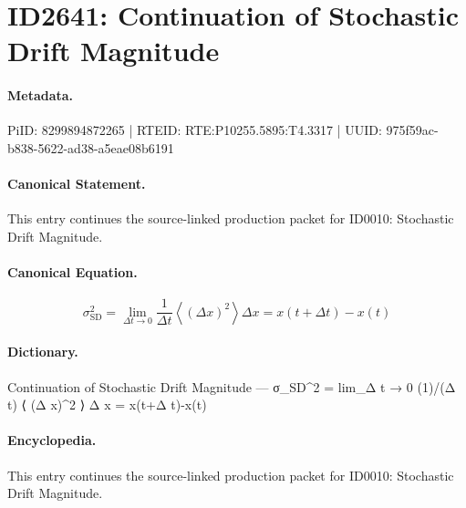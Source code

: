 \section*{ID2641: Continuation of Stochastic Drift Magnitude}
\paragraph{Metadata.}
PiID: 8299894872265 | RTEID: RTE:P10255.5895:T4.3317 | UUID: 975f59ac-b838-5622-ad38-a5eae08b6191

\paragraph{Canonical Statement.}
This entry continues the source-linked production packet for ID0010: Stochastic Drift Magnitude.

\paragraph{Canonical Equation.}
\[
\sigma_{\mathrm{SD}}^{2} = \lim_{\Delta t \to 0} \frac{1}{\Delta t} \left\langle (\Delta x)^{2} \right\rangle \Delta x = x(t+\Delta t)-x(t)
\]

\paragraph{Dictionary.}
Continuation of Stochastic Drift Magnitude — σ\_SD\textasciicircum{}2 = lim\_Δ t → 0 (1)/(Δ t) ⟨ (Δ x)\textasciicircum{}2 ⟩ Δ x = x(t+Δ t)-x(t)

\paragraph{Encyclopedia.}
This entry continues the source-linked production packet for ID0010: Stochastic Drift Magnitude.
